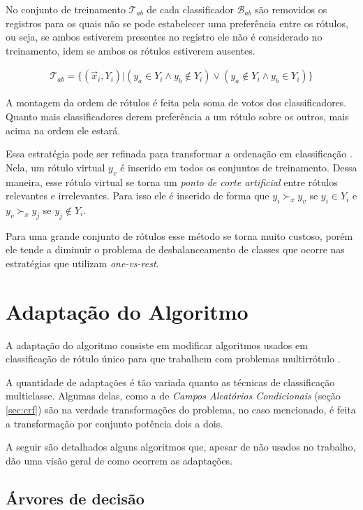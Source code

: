 \documentclass[runningheads,a4paper]{llncs}
\begin{document}
No conjunto de treinamento $\mathcal{T}_{ab}$ de cada classificador $\mathcal{B}_{ab}$ são removidos os registros para os quais não se pode estabelecer uma preferência entre os rótulos, ou seja, se ambos estiverem presentes no registro ele não é considerado no treinamento, idem se ambos os rótulos estiverem ausentes.

\begin{align*}
	\mathcal{T}_{ab} = \{(\vec{x}_i, Y_i) | (y_a \in Y_i \wedge y_b \notin Y_i) \vee (y_a \notin Y_i \wedge y_b \in Y_i)\}
\end{align*}

A montagem da ordem de rótulos é feita pela soma de votos dos classificadores. Quanto mais classificadores derem preferência a um rótulo sobre os outros, mais acima na ordem ele estará.

Essa estratégia pode ser refinada para transformar a ordenação em classificação \cite{Furnkranz2008-rf}. Nela, um rótulo virtual $y_v$ é inserido em todos os conjuntos de treinamento. Dessa maneira, esse rótulo virtual se torna um \textit{ponto de corte artificial} entre rótulos relevantes e irrelevantes. Para isso ele é inserido de forma que $y_i \succ_x y_v$ se $y_i \in Y_i$ e $y_v \succ_x y_j$ se $y_j \notin Y_i$.

Para uma grande conjunto de rótulos esse método se torna muito custoso, porém ele tende a diminuir o problema de desbalanceamento de classes que ocorre nas estratégias que utilizam \textit{one-vs-rest}.


\section{Adaptação do Algoritmo}\label{sec:adaptacao}

A adaptação do algoritmo consiste em modificar algoritmos usados em classificação de rótulo único para que trabalhem com problemas multirrótulo \cite{Tsoumakas2007-cw}.

A quantidade de adaptações é tão variada quanto as técnicas de classificação multiclasse. Algumas delas, como a de \textit{Campos Aleatórios Condicionais} (seção \ref{sec:crf}) são na verdade transformações do problema, no caso mencionado, é feita a transformação por conjunto potência dois a dois.

A seguir são detalhados alguns algoritmos que, apesar de não usados no trabalho, dão uma visão geral de como ocorrem as adaptações.

\subsection{Árvores de decisão}
\end{document}
